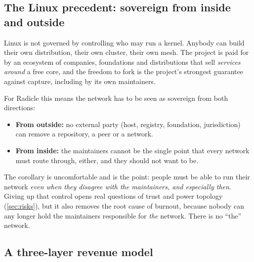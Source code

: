 \documentclass[a4paper,11pt,twoside,parskip=half-,headings=small]{scrartcl}
\begin{document}
\subsection{The Linux precedent: sovereign from inside and outside}
Linux is not governed by controlling who may run a kernel. Anybody can build their own
distribution, their own cluster, their own mesh. The project is paid for by an
ecosystem of companies, foundations and distributions that sell \emph{services around}
a free core, and the freedom to fork is the project's strongest guarantee against capture,
including by its own maintainers.

For Radicle this means the network has to be seen as sovereign from both directions:
\begin{itemize}
  \item \textbf{From outside:} no external party (host, registry, foundation, jurisdiction)
        can remove a repository, a peer or a network.
  \item \textbf{From inside:} the maintainers cannot be the single point that every
        network must route through, either, and they should not want to be.
\end{itemize}
The corollary is uncomfortable and is the point: people must be able to run their network
\emph{even when they disagree with the maintainers, and especially then}. Giving up that
control opens real questions of trust and power topology (\cref{sec:risks}), but
it also removes the root cause of burnout, because nobody can any longer hold the
maintainers responsible for \emph{the} network. There is no ``the'' network.

\subsection{A three-layer revenue model}
\end{document}
